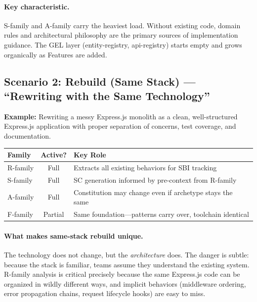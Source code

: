 \documentclass[11pt,a4paper,openright,twoside]{report}
\begin{document}
\paragraph{Key characteristic.}
S-family and A-family carry the heaviest load. Without existing code, domain rules and architectural philosophy are the primary sources of implementation guidance. The GEL layer (entity-registry, api-registry) starts empty and grows organically as Features are added.

\subsection{Scenario 2: Rebuild (Same Stack) --- ``Rewriting with the Same Technology''}
\label{sec:scenario-rebuild-same}

\textbf{Example:} Rewriting a messy Express.js monolith as a clean, well-structured Express.js application with proper separation of concerns, test coverage, and documentation.

\begin{center}
\begin{tabular}{lcp{8cm}}
\toprule
\textbf{Family} & \textbf{Active?} & \textbf{Key Role} \\
\midrule
R-family & Full & Extracts all existing behaviors for SBI tracking \\
S-family & Full & SC generation informed by pre-context from R-family \\
A-family & Full & Constitution may change even if archetype stays the same \\
F-family & Partial & Same foundation---patterns carry over, toolchain identical \\
\bottomrule
\end{tabular}
\end{center}

\paragraph{What makes same-stack rebuild unique.}
The technology does not change, but the \emph{architecture} does. The danger is subtle: because the stack is familiar, teams assume they understand the existing system. R-family analysis is critical precisely because the same Express.js code can be organized in wildly different ways, and implicit behaviors (middleware ordering, error propagation chains, request lifecycle hooks) are easy to miss.
\end{document}
